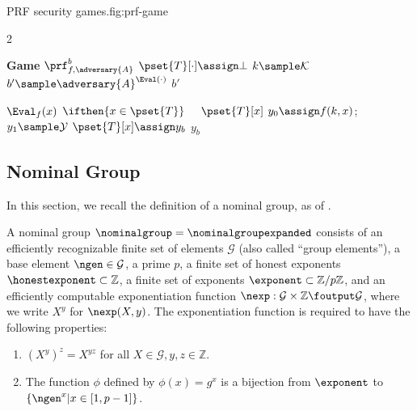     \begin{gamefigure}{PRF security games.}{fig:prf-game}
        \begin{games}{2}
            \begin{gameenv}{\textbf{Game} $\prf^b_{f, \adversary{A}}$}
                \State $\pset{T}[\cdot] \assign \bot$
                \State $k \sample \mathcal{K}$
                \State $b' \sample \adversary{A}^{\Eval(\cdot)}$
                \State \Return $b'$
            \end{gameenv}
            \gamebreak
            \begin{gameenv}{\oracle $\Eval_{f}(x)$}
                \State $\ifthen{x \in \pset{T}}$
                    \State $\quad $\Return $\pset{T}[x]$
                    \State $y_0 \assign f(k, x)$; $y_1 \sample \mathcal{Y}$
                    \State $\pset{T}[x] \assign y_b$
                    \State \Return $y_b$
                \end{gameenv}
            \end{games}
        \end{gamefigure}


        \subsection{Nominal Group}
        In this section, we recall the definition of a nominal group, as of \cite{EC:ABHKLR21}.

        \begin{definition}
            A nominal group $\nominalgroup =\nominalgroupexpanded$ consists of an efficiently recognizable finite set of elements $\mathcal{G}$ (also called ``group elements''), a base element $\ngen \in \mathcal{G}$, a prime $p$, a finite set of honest exponents $\honestexponent \subset \mathbb{Z}$, a finite set of exponents $\exponent \subset \mathbb{Z} / p\mathbb{Z}$, and an efficiently computable exponentiation function $\nexp : \mathcal{G} \times \mathbb{Z} \foutput \mathcal{G}$, where we write $X^y$ for $\nexp(X, y)$.
            The exponentiation function is required to have the following properties:

            \begin{enumerate}
            \item $(X^y)^z = X^{yz} $ for all $ X \in \mathcal{G}, y, z \in \mathbb{Z}$.
            \item The function $\phi$ defined by $\phi(x) = g^x$ is a bijection from $\exponent$ to $\{\ngen^x | x \in [1, p - 1]\}$.
            \end{enumerate}
        \end{definition}

